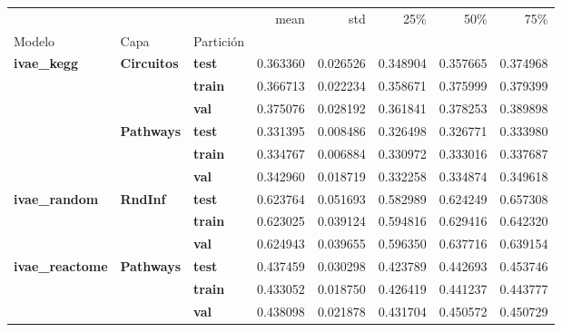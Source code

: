 \begin{tabular}{lllrrrrr}
\toprule
 &  &  & mean & std & 25\% & 50\% & 75\% \\
Modelo & Capa & Partición &  &  &  &  &  \\
\midrule
\multirow[t]{6}{*}{\textbf{ivae\_kegg}} & \multirow[t]{3}{*}{\textbf{Circuitos}} & \textbf{test} & 0.363360 & 0.026526 & 0.348904 & 0.357665 & 0.374968 \\
\textbf{} & \textbf{} & \textbf{train} & 0.366713 & 0.022234 & 0.358671 & 0.375999 & 0.379399 \\
\textbf{} & \textbf{} & \textbf{val} & 0.375076 & 0.028192 & 0.361841 & 0.378253 & 0.389898 \\
\cline{2-8}
\textbf{} & \multirow[t]{3}{*}{\textbf{Pathways}} & \textbf{test} & 0.331395 & 0.008486 & 0.326498 & 0.326771 & 0.333980 \\
\textbf{} & \textbf{} & \textbf{train} & 0.334767 & 0.006884 & 0.330972 & 0.333016 & 0.337687 \\
\textbf{} & \textbf{} & \textbf{val} & 0.342960 & 0.018719 & 0.332258 & 0.334874 & 0.349618 \\
\cline{1-8} \cline{2-8}
\multirow[t]{3}{*}{\textbf{ivae\_random}} & \multirow[t]{3}{*}{\textbf{RndInf}} & \textbf{test} & 0.623764 & 0.051693 & 0.582989 & 0.624249 & 0.657308 \\
\textbf{} & \textbf{} & \textbf{train} & 0.623025 & 0.039124 & 0.594816 & 0.629416 & 0.642320 \\
\textbf{} & \textbf{} & \textbf{val} & 0.624943 & 0.039655 & 0.596350 & 0.637716 & 0.639154 \\
\cline{1-8} \cline{2-8}
\multirow[t]{3}{*}{\textbf{ivae\_reactome}} & \multirow[t]{3}{*}{\textbf{Pathways}} & \textbf{test} & 0.437459 & 0.030298 & 0.423789 & 0.442693 & 0.453746 \\
\textbf{} & \textbf{} & \textbf{train} & 0.433052 & 0.018750 & 0.426419 & 0.441237 & 0.443777 \\
\textbf{} & \textbf{} & \textbf{val} & 0.438098 & 0.021878 & 0.431704 & 0.450572 & 0.450729 \\
\cline{1-8} \cline{2-8}
\bottomrule
\end{tabular}
